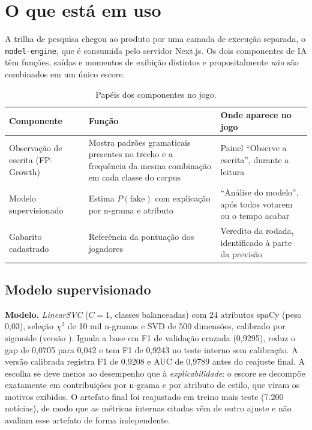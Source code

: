 \documentclass[brazilian,11pt,a4paper]{article}
\begin{document}
\section{O que está em uso}

A trilha de pesquisa chegou ao produto por uma camada de execução separada, o \texttt{model-engine}, que é consumida pelo servidor Next.js. Os dois componentes de IA têm funções, saídas e momentos de exibição distintos e propositalmente \emph{não} são combinados em um único escore.

\begin{table}[h]
\centering
\small
\begin{tabular}{@{}p{3.2cm}p{4.6cm}p{6.2cm}@{}}
\toprule
\textbf{Componente} & \textbf{Função} & \textbf{Onde aparece no jogo}\\
\midrule
Observação de escrita (FP-Growth) & Mostra padrões gramaticais presentes no trecho e a frequência da mesma combinação em cada classe do corpus & Painel ``Observe a escrita'', durante a leitura\\
Modelo supervisionado & Estima $P(\text{fake})$ com explicação por n-grama e atributo & ``Análise do modelo'', após todos votarem ou o tempo acabar\\
Gabarito cadastrado & Referência da pontuação dos jogadores & Veredito da rodada, identificado à parte da previsão\\
\bottomrule
\end{tabular}
\caption{Papéis dos componentes no jogo.}
\end{table}

\subsection{Modelo supervisionado}

\textbf{Modelo.} \textit{LinearSVC} ($C{=}1$, classes balanceadas) com 24 atributos spaCy (peso 0,03), seleção $\chi^2$ de 10 mil n-gramas e SVD de 500 dimensões, calibrado por sigmoide (versão ). Iguala a base em F1 de validação cruzada (0,9295), reduz o gap de 0,0705 para 0,042 e tem F1 de 0,9243 no teste interno sem calibração. A versão calibrada registra F1 de 0,9208 e AUC de 0,9789 antes do reajuste final. A escolha se deve menos ao desempenho que à \emph{explicabilidade}: o escore se decompõe exatamente em contribuições por n-grama e por atributo de estilo, que viram os motivos exibidos. O artefato final foi reajustado em treino mais teste (7.200 notícias), de modo que as métricas internas citadas vêm de outro ajuste e não avaliam esse artefato de forma independente.
\end{document}
